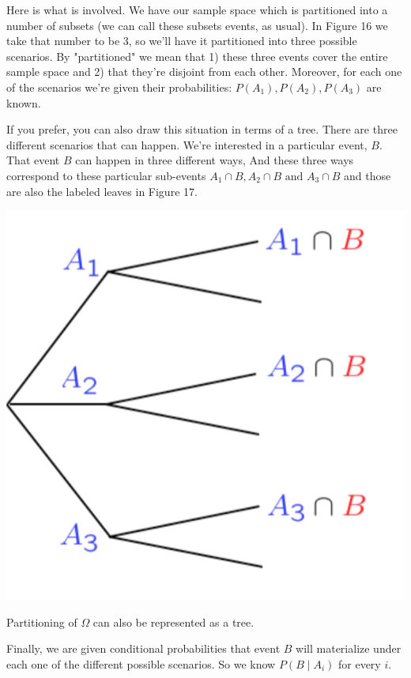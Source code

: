 \documentclass{tufte-handout}
\begin{document}
Here is what is involved. We have our sample space which is partitioned into a
number of subsets (we can call these subsets events, as usual). In Figure 16 we take that number to be 3, so we'll have it partitioned into
three possible scenarios. By "partitioned" we mean that 1) these three events cover the entire sample space
and 2) that they're disjoint from each other. Moreover, for each one of the scenarios we're given their probabilities: $P(A_1), P(A_2), P(A_3)$ are known.

If you prefer, you can also draw this situation in terms of a tree. There are three different scenarios that
can happen. We're interested in a particular event, $B$. That event $B$ can happen in three different ways, And these 
three ways correspond
to these particular sub-events $A_1 \cap B, A_2 \cap B \text{ and } A_3 \cap B$ and those are also the labeled leaves in Figure 17.

\begin{marginfigure}
  \includegraphics[scale = 0.3]{TotalProbAsTree}
  \caption{Partitioning of $\Omega$ can also be represented as a tree.}
\end{marginfigure}


\vspace{0.2cm}
Finally, we are given conditional probabilities that event $B$ will materialize under each one of the
different possible scenarios. So we know $P(B \mid A_i)$ for every $i$.
\end{document}
